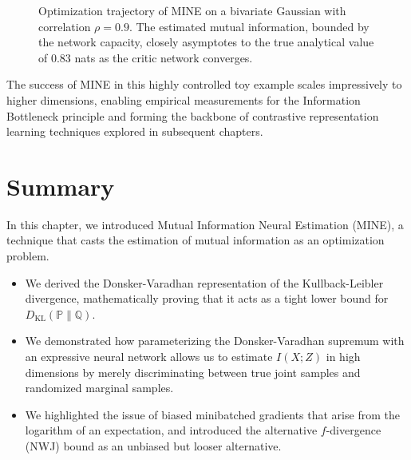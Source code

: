\begin{figure}[htpb]
\centering
{}
\caption{Optimization trajectory of MINE on a bivariate Gaussian with correlation $\rho = 0.9$. The estimated mutual information, bounded by the network capacity, closely asymptotes to the true analytical value of 0.83 nats as the critic network converges.}
\label{fig:mine_gaussian}
\end{figure}

The success of MINE in this highly controlled toy example scales impressively to higher dimensions, enabling empirical measurements for the Information Bottleneck principle and forming the backbone of contrastive representation learning techniques explored in subsequent chapters.

\section{Summary}

In this chapter, we introduced Mutual Information Neural Estimation (MINE), a technique that casts the estimation of mutual information as an optimization problem.
\begin{itemize}
    \item We derived the Donsker-Varadhan representation of the Kullback-Leibler divergence, mathematically proving that it acts as a tight lower bound for $D_{\text{KL}}(\mathbb{P} \parallel \mathbb{Q})$.
    \item We demonstrated how parameterizing the Donsker-Varadhan supremum with an expressive neural network allows us to estimate $I(X; Z)$ in high dimensions by merely discriminating between true joint samples and randomized marginal samples.
    \item We highlighted the issue of biased minibatched gradients that arise from the logarithm of an expectation, and introduced the alternative $f$-divergence (NWJ) bound as an unbiased but looser alternative.
\end{itemize}


